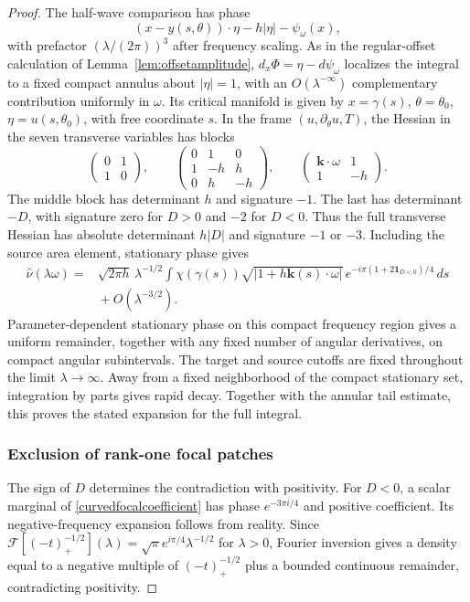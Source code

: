 \documentclass[11pt]{article}
\newcommand{\dd}{\,d}
\begin{document}
\begin{proof}
The half-wave comparison has phase
\[
 (x-y(s,\theta))\cdot\eta-h|\eta|-\psi_\omega(x),
\]
with prefactor $(\lambda/(2\pi))^3$ after frequency scaling. As in the regular-offset calculation of Lemma~\ref{lem:offsetamplitude}, $d_x\Phi=\eta-d\psi_\omega$ localizes the integral to a fixed compact annulus about $|\eta|=1$, with an $O(\lambda^{-\infty})$ complementary contribution uniformly in $\omega$. Its critical manifold is given by $x=\gamma(s)$, $\theta=\theta_0$, $\eta=u(s,\theta_0)$, with free coordinate $s$. In the frame $(u,\partial_\theta u,T)$, the Hessian in the seven transverse variables has blocks
\[
 \begin{pmatrix}0&1\\1&0\end{pmatrix},\qquad
 \begin{pmatrix}0&1&0\\1&-h&h\\0&h&-h\end{pmatrix},\qquad
 \begin{pmatrix}\mathbf k\cdot\omega&1\\1&-h\end{pmatrix}.
\]
The middle block has determinant $h$ and signature $-1$. The last has determinant $-D$, with signature zero for $D>0$ and $-2$ for $D<0$. Thus the full transverse Hessian has absolute determinant $h|D|$ and signature $-1$ or $-3$. Including the source area element, stationary phase gives
\begin{equation}\label{curvedfocalcoefficient}
 \begin{split}
 \widehat\nu(\lambda\omega)
 ={}&\sqrt{2\pi h}\,\lambda^{-1/2}
 \int\chi(\gamma(s))\sqrt{|1+h\mathbf k(s)\cdot\omega|}\,
 e^{-i\pi(1+2\mathbf1_{D<0})/4}\dd s\\
 &{}+O(\lambda^{-3/2}).
 \end{split}
\end{equation}
Parameter-dependent stationary phase on this compact frequency region gives a uniform remainder, together with any fixed number of angular derivatives, on compact angular subintervals. The target and source cutoffs are fixed throughout the limit $\lambda\to\infty$. Away from a fixed neighborhood of the compact stationary set, integration by parts gives rapid decay. Together with the annular tail estimate, this proves the stated expansion for the full integral.

\subsubsection{Exclusion of rank-one focal patches}
The sign of $D$ determines the contradiction with positivity. For $D<0$, a scalar marginal of \eqref{curvedfocalcoefficient} has phase $e^{-3\pi i/4}$ and positive coefficient. Its negative-frequency expansion follows from reality. Since $\mathcal F[(-t)_+^{-1/2}](\lambda)=\sqrt\pi e^{i\pi/4}\lambda^{-1/2}$ for $\lambda>0$, Fourier inversion gives a density equal to a negative multiple of $(-t)_+^{-1/2}$ plus a bounded continuous remainder, contradicting positivity.


\end{proof}
\end{document}
